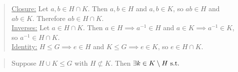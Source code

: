 \begin{compactenum}
    \item
    \begin{compactenum}
        \item
        \begin{quote}
            \underline{Closure:} Let $a,b\in H\cap K$. Then $a,b\in H$ and $a,b\in K$, so $ab\in H$ and $ab\in K$. Therefore $ab\in H\cap K$.\\
            \underline{Inverses:} Let $a\in H\cap K$. Then $a\in H\implies a^{-1}\in H$ and $a\in K\implies a^{-1}\in K$, so $a^{-1}\in H\cap K$.\\
            \underline{Identity:} $H\leq G\implies e\in H$ and $K\leq G\implies e\in K$, so $e\in H\cap K$.
        \end{quote}
        \item
        \begin{quote}
            Suppose $H\cup K\leq G$ with $H\not\subset K$. Then $\exists k\in K\setminus H\text{ s.t. } $
        \end{quote}
    \end{compactenum}
\end{compactenum}
